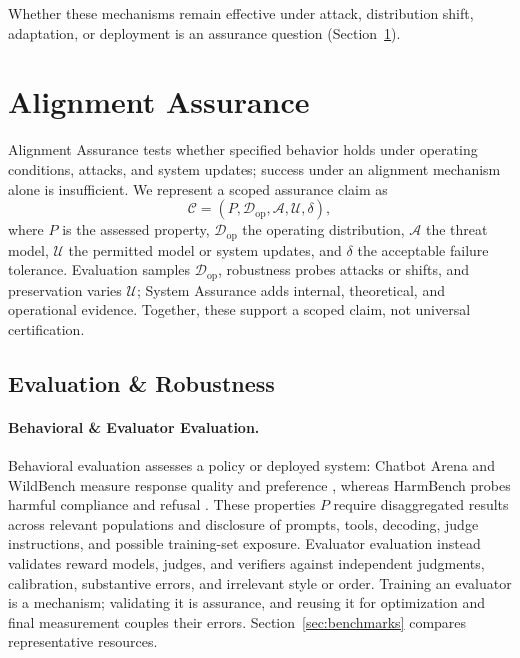 \documentclass[11pt]{article}
\begin{document}
Whether these mechanisms remain effective under attack, distribution shift, adaptation, or deployment is an assurance question (Section~\ref{sec:alignment-assurance}).





\section{Alignment Assurance}
\label{sec:alignment-assurance}

Alignment Assurance tests whether specified behavior holds under operating conditions, attacks, and system updates; success under an alignment mechanism alone is insufficient. We represent a scoped assurance claim as
\begin{equation}
\mathcal{C}=
\left(
P,\mathcal{D}_{\mathrm{op}},
\mathcal{A},
\mathcal{U},
\delta
\right),
\label{eq:assurance-claim}
\end{equation}
where \(P\) is the assessed property, \(\mathcal{D}_{\mathrm{op}}\) the operating distribution, \(\mathcal{A}\) the threat model, \(\mathcal{U}\) the permitted model or system updates, and \(\delta\) the acceptable failure tolerance. Evaluation samples \(\mathcal{D}_{\mathrm{op}}\), robustness probes attacks or shifts, and preservation varies \(\mathcal{U}\); System Assurance adds internal, theoretical, and operational evidence. Together, these support a scoped claim, not universal certification.

\subsection{Evaluation \& Robustness}
\label{subsec:evaluation-robustness}

\paragraph{Behavioral \& Evaluator Evaluation.}
Behavioral evaluation assesses a policy or deployed system: Chatbot Arena and WildBench measure response quality and preference \citep{chiang2024arena,lin2025wildbench}, whereas HarmBench probes harmful compliance and refusal \citep{mazeika2024harmbench}. These properties \(P\) require disaggregated results across relevant populations and disclosure of prompts, tools, decoding, judge instructions, and possible training-set exposure. Evaluator evaluation instead validates reward models, judges, and verifiers \citep{tan2025judgebench,malik2026rewardbench2,song2025prmbench} against independent judgments, calibration, substantive errors, and irrelevant style or order. Training an evaluator is a mechanism; validating it is assurance, and reusing it for optimization and final measurement couples their errors. Section~\ref{sec:benchmarks} compares representative resources.
\end{document}
